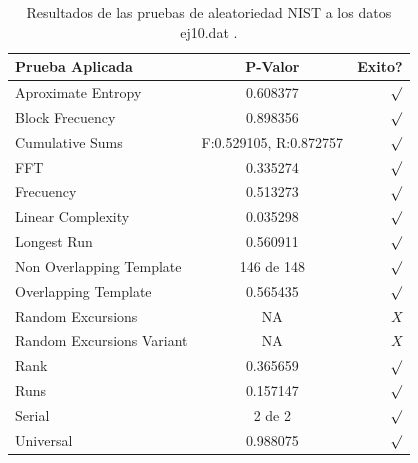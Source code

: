 \documentclass[10pt]{IEEEtran}
\begin{document}
\begin{table}[H]
\caption{Resultados de las pruebas de aleatoriedad NIST a los datos ej10.dat .}
\label{caso10}
\begin{center}
\begin{small}
\begin{tabular}{|l|c|r|}
\hline

Prueba Aplicada &  P-Valor & Exito? \\
\hline

Aproximate Entropy    &  0.608377  & $\surd$ \\

Block Frecuency  & 0.898356 &   $\surd$   \\

Cumulative Sums    &   F:0.529105, R:0.872757 & $\surd$ \\

FFT    &    0.335274   &  $\surd$     \\

Frecuency     &  0.513273  &  $\surd$   \\

Linear Complexity      & 0.035298 & $\surd$ \\

Longest Run      & 0.560911 &    $\surd$      \\

Non Overlapping Template      & 146 de 148    &     $\surd$          \\

Overlapping Template      &  0.565435  &      $\surd$      \\

Random Excursions      & NA  &    $X$      \\

Random Excursions Variant & NA &     $X$    \\

Rank &  0.365659  &      $\surd$      \\

Runs &   0.157147  &     $\surd$        \\

Serial &     2 de 2    &     $\surd$        \\

Universal &   0.988075 &   $\surd$            \\

\hline

\end{tabular}
\end{small}
\end{center}
\end{table}
\end{document}

